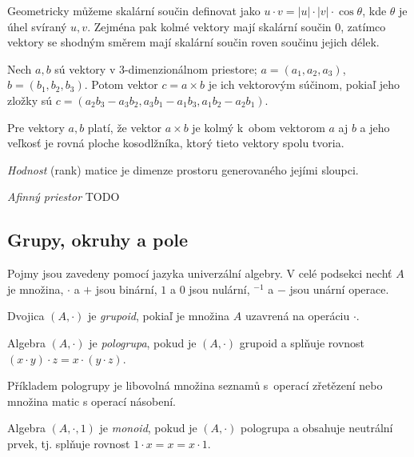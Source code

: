 Geometricky můžeme skalární součin definovat jako
$u \cdot v = \lvert u \rvert \cdot \lvert v \rvert \cdot \cos \theta$,
kde $\theta$ je úhel svíraný $u,v$. Zejména pak kolmé
vektory mají skalární součin 0, zatímco vektory se shodným směrem
mají skalární součin roven součinu jejich délek.

\begin{definition}
	Nech $a,b$ sú vektory v 3-dimenzionálnom priestore;
	$a=(a_1, a_2, a_3)$, $b=(b_1, b_2, b_3)$. Potom
	vektor $c = a \times b$ je ich vektorovým súčinom,
	pokiaľ jeho zložky sú 
	$c=(a_2 b_3 - a_3 b_2, a_3 b_1 - a_1 b_3, a_1 b_2 - a_2 b_1)$.
\end{definition}

Pre vektory $a,b$ platí, že vektor $a \times b$ je kolmý
k~obom vektorom $a$ aj $b$ a jeho veľkosť je rovná ploche
kosodlžníka, ktorý tieto vektory spolu tvoria.

{\em Hodnost} (rank) matice je dimenze
prostoru generovaného jejími sloupci.

\begin{definition}
	{\em Afinný priestor} TODO
\end{definition}



\subsection{Grupy, okruhy a pole}

Pojmy jsou zavedeny pomocí jazyka univerzální algebry. V celé podsekci
nechť $A$ je množina, $\cdot$ a $+$ jsou binární, $1$ a $0$ jsou
nulární, ${^{-1}}$ a $-$ jsou unární operace.

\begin{definition}[Grupoid]
    Dvojica $(A, \cdot)$ je {\em grupoid},
    pokiaľ je množina $A$ uzavrená
	na operáciu $\cdot$.
\end{definition}

\begin{definition}[Pologrupa]
    Algebra $(A, \cdot)$ je {\em pologrupa},
    pokud je $(A, \cdot)$ grupoid a splňuje rovnost
    $(x \cdot y) \cdot z = x \cdot (y \cdot z)$.
\end{definition}

Příkladem pologrupy je libovolná množina seznamů s~operací zřetězení
nebo množina matic s operací násobení.

\begin{definition}[Monoid]
    Algebra $(A, \cdot, 1)$ je {\em monoid}, pokud
    je $(A, \cdot)$ pologrupa a obsahuje neutrální prvek, tj. splňuje rovnost
    $1 \cdot x = x = x \cdot 1$.
\end{definition}


